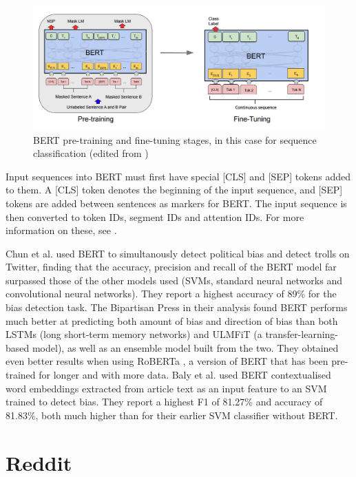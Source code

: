 \begin{figure}
    \centering
    \includegraphics[scale=0.37]{0-img/bert-pretraining-finetuning.png}
    \caption{BERT pre-training and fine-tuning stages, in this case for sequence classification (edited from \cite{bert})}
    \label{fig:bert-pretraining-finetuning}
\end{figure}

Input sequences into BERT must first have special [CLS] and [SEP] tokens added to them. A [CLS] token denotes the beginning of the input sequence, and [SEP] tokens are added between sentences as markers for BERT. The input sequence is then converted to token IDs, segment IDs and attention IDs. For more information on these, see \cite{bert}.

Chun et al. \cite{chun} used BERT to simultanously detect political bias and detect trolls on Twitter, finding that the accuracy, precision and recall of the BERT model far surpassed those of the other models used (SVMs, standard neural networks and convolutional neural networks). They report a highest accuracy of 89\% for the bias detection task. The Bipartisan Press in their analysis \cite{bipartisan-press} found BERT performs much better at predicting both amount of bias and direction of bias than both LSTMs (long short-term memory networks) and ULMFiT (a transfer-learning-based model), as well as an ensemble model built from the two. They obtained even better results when using RoBERTa \cite{roberta}, a version of BERT that has been pre-trained for longer and with more data. Baly et al. \cite{baly-acl2020} used BERT contextualised word embeddings extracted from article text as an input feature to an SVM trained to detect bias. They report a highest F1 of 81.27\% and accuracy of 81.83\%, both much higher than for their earlier SVM classifier without BERT.

\section{Reddit} \label{sec:reddit}

